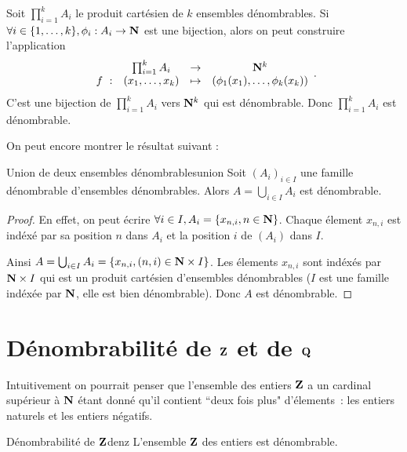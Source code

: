 \documentclass[a4paper,french,final]{memoir}
\begin{document}
Soit $\prod_{i =1}^k A_i$ le produit cartésien de $k$ ensembles dénombrables. Si $\forall i \in \{1,\dots,k\}, \phi_i : A_i \to \NN$ est une bijection, alors on peut construire l'application \[ \begin{array}{cccc}
	\ & \prod_{i=1}^k A_i & \to & \NN^k\\
	f~: & (x_1,\dots,x_k) & \mapsto & (\phi_1(x_1),\dots, \phi_k(x_k))
	\end{array}.\] 
C'est une bijection de $\prod_{i=1}^k A_i $ vers $\mathbf{N}^k$ qui est dénombrable. Donc $\prod_{i=1}^kA_i$ est dénombrable.


On peut encore montrer le résultat suivant : 
\begin{theoremb}{Union de deux ensembles dénombrables}{union}
    Soit $(A_i)_{i \in I}$ une famille dénombrable d'ensembles dénombrables. 
	Alors $A= \bigcup_{i \in I} A_i$ est dénombrable. 
\end{theoremb} 
\begin{proof}
	En effet, on peut écrire $\forall i \in I, A_i = \{x_{n,i}, n \in \mathbf{N}\}$. Chaque élement $x_{n, i}$ est indéxé par sa position $n$ dans $A_i$ et la position $i$ de $(A_i)$ dans $I$. 
	
	Ainsi $A = \bigcup_{i \in I} A_i = \{x_{n, i}, (n,i) \in \mathbf{N} \times I\}$. Les élements $x_{n,i}$ sont indéxés par $\mathbf{N} \times I$ qui est un produit cartésien d'ensembles dénombrables ($I$ est une famille indéxée par $\mathbf{N}$, elle est bien dénombrable). Donc $A$ est dénombrable.
\end{proof}
\section{\texorpdfstring{Dénombrabilité de $\mathbf{Z}$ et de $\mathbf{Q}$}{Dénombrabilité de Z et Q}}

Intuitivement on pourrait penser que l'ensemble des entiers $\mathbf{Z}$ a un cardinal supérieur à $\mathbf{N}$ étant donné qu'il contient ``deux fois plus" d'élements~: les entiers naturels et les entiers négatifs. 

\begin{theoremb}{Dénombrabilité de $\mathbf{Z}$}{denz}
	L'ensemble $\mathbf{Z}$ des entiers est dénombrable. 
\end{theoremb}
\end{document}
